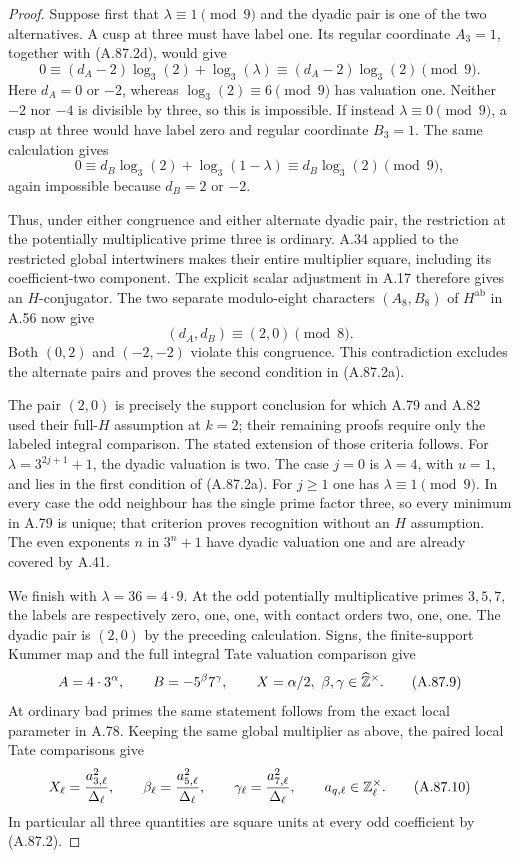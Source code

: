 \begin{proof}
Suppose first that $\lambda\equiv1\pmod9$ and the
dyadic pair is one of the two alternatives.
A cusp at three must have label one.  Its regular
coordinate $A_3=1$, together with (A.87.2d), would give
\[
       0\equiv(d_A-2)\log_3(2)+\log_3(\lambda)
                  \equiv(d_A-2)\log_3(2)\pmod9.
\tag{A.87.2e}
\]
Here $d_A=0$ or $-2$, whereas
$\log_3(2)\equiv6\pmod9$ has valuation one.
Neither $-2$ nor $-4$ is divisible by three, so this
is impossible.
If instead $\lambda\equiv0\pmod9$, a cusp at three
would have label zero and regular coordinate $B_3=1$.
The same calculation gives
\[
       0\equiv d_B\log_3(2)+\log_3(1-\lambda)
                      \equiv d_B\log_3(2)\pmod9,
\tag{A.87.2f}
\]
again impossible because $d_B=2$ or $-2$.

Thus, under either congruence and either alternate
dyadic pair, the restriction at the potentially
multiplicative prime three is ordinary.
A.34 applied to the restricted global intertwiners
makes their entire multiplier square, including its
coefficient-two component.  The explicit scalar
adjustment in A.17 therefore gives an $H$-conjugator.
The two separate modulo-eight characters
$(A_8,B_8)$ of $H^{\mathrm{ab}}$ in A.56 now give
\[
                      (d_A,d_B)\equiv(2,0)\pmod8.
\tag{A.87.2g}
\]
Both $(0,2)$ and $(-2,-2)$ violate this congruence.
This contradiction excludes the alternate pairs and
proves the second condition in (A.87.2a).

The pair $(2,0)$ is precisely the support conclusion for which
A.79 and A.82 used their full-$H$ assumption at $k=2$;
their remaining proofs require only the labeled
integral comparison.  The stated extension of those
criteria follows.
For $\lambda=3^{2j+1}+1$, the dyadic valuation is two.
The case $j=0$ is $\lambda=4$, with $u=1$, and lies
in the first condition of (A.87.2a).
For $j\ge1$ one has $\lambda\equiv1\pmod9$.
In every case the odd neighbour has the single prime
factor three, so every minimum in A.79 is unique;
that criterion proves recognition without an $H$
assumption.  The even exponents $n$ in $3^n+1$ have
dyadic valuation one and are already covered by A.41.

We finish with $\lambda=36=4\cdot9$.
At the odd potentially multiplicative primes $3,5,7$,
the labels are respectively zero, one, one, with
contact orders two, one, one.
The dyadic pair is $(2,0)$ by the preceding calculation.
Signs, the finite-support Kummer map and the full
integral Tate valuation comparison give
\[
 A=4\cdot3^{\alpha},\qquad B=-5^{\beta}7^{\gamma},
 \qquad X=\alpha/2,\ \beta,\gamma\in\widehat{\mathbb Z}^\times.
\tag{A.87.9}
\]
At ordinary bad primes the same statement follows from
the exact local parameter in A.78.
Keeping the same global multiplier as above, the
paired local Tate comparisons give
\[
 X_\ell=\frac{a_{3,\ell}^2}{\Delta_\ell},\qquad
 \beta_\ell=\frac{a_{5,\ell}^2}{\Delta_\ell},\qquad
 \gamma_\ell=\frac{a_{7,\ell}^2}{\Delta_\ell},
       \qquad a_{q,\ell}\in\mathbb Z_\ell^\times.
\tag{A.87.10}
\]
In particular all three quantities are square units
at every odd coefficient by (A.87.2).


\end{proof}
